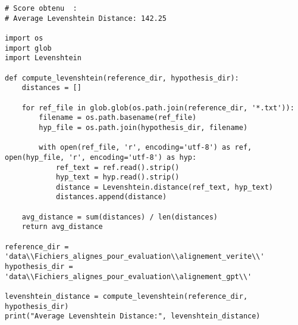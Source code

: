 \begin{verbatim}
# Score obtenu  :
# Average Levenshtein Distance: 142.25

import os
import glob
import Levenshtein

def compute_levenshtein(reference_dir, hypothesis_dir):
    distances = []

    for ref_file in glob.glob(os.path.join(reference_dir, '*.txt')):
        filename = os.path.basename(ref_file)
        hyp_file = os.path.join(hypothesis_dir, filename)

        with open(ref_file, 'r', encoding='utf-8') as ref, open(hyp_file, 'r', encoding='utf-8') as hyp:
            ref_text = ref.read().strip()
            hyp_text = hyp.read().strip()
            distance = Levenshtein.distance(ref_text, hyp_text)
            distances.append(distance)
    
    avg_distance = sum(distances) / len(distances)
    return avg_distance

reference_dir = 'data\\Fichiers_alignes_pour_evaluation\\alignement_verite\\'
hypothesis_dir = 'data\\Fichiers_alignes_pour_evaluation\\alignement_gpt\\'

levenshtein_distance = compute_levenshtein(reference_dir, hypothesis_dir)
print("Average Levenshtein Distance:", levenshtein_distance)
\end{verbatim}